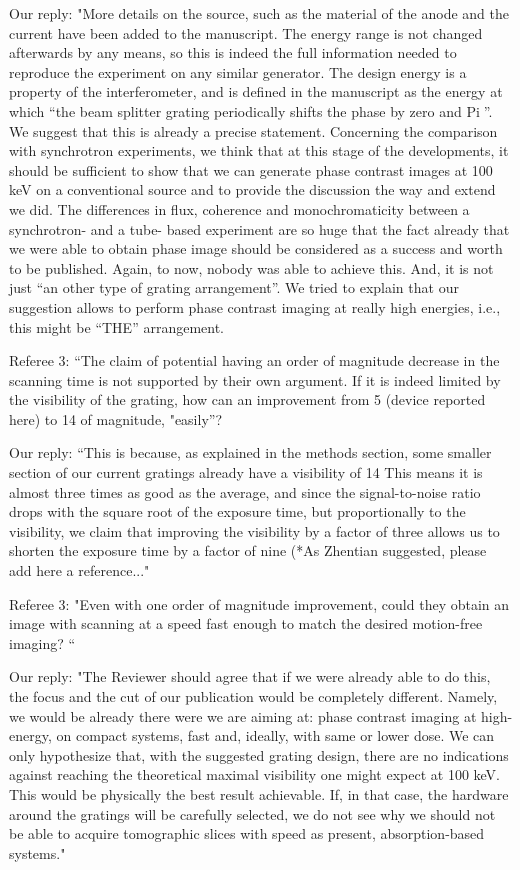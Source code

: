 \documentclass[a4paper,english]{scrartcl} \usepackage[detect-all]{siunitx}
\begin{document}
Our reply: "More details on the source, such as the material of the anode
and the current have been added to the manuscript. The energy range is not
changed afterwards by any means, so this is indeed the full information
needed to reproduce the experiment on any similar generator. The design
energy is a property of the interferometer, and is defined in the manuscript
as the energy at which “the beam splitter grating periodically shifts the
phase by zero and Pi”. We suggest that this is already a precise
statement. Concerning the comparison with synchrotron experiments, we think
that at this stage of the developments, it should be sufficient to show that
we can generate phase contrast images at 100 keV on a conventional source
and to provide the discussion the way and extend we did. The differences in
flux, coherence and monochromaticity between a synchrotron- and a tube-
based experiment are so huge that the fact already that we were able to
obtain phase image should be considered as a success and worth to be
published. Again, to now, nobody was able to achieve this. And, it is not
just “an other type of grating arrangement”. We tried to explain that our
suggestion  allows to perform phase contrast imaging at really high
energies, i.e., this might be “THE” arrangement.

Referee 3: “The claim of potential having an order of magnitude decrease in
the scanning time is not supported by their own argument. If it is indeed
limited by the visibility of the grating, how can an improvement from 5%
(device reported here) to 14%
of magnitude, "easily”? 

Our reply: “This is because, as explained in the methods section, some
smaller section of our current gratings already have a visibility of 14 %
This means it is almost three times as good as the average, and since the
signal-to-noise ratio drops with the square root of the exposure time, but
proportionally to the visibility, we claim that improving the visibility by
a factor of three allows us to shorten the exposure time by a factor of nine
(*As Zhentian suggested, please add here a reference..."

Referee 3: "Even with one order of magnitude improvement, could they obtain
an image with scanning at a speed fast enough to match the desired
motion-free imaging? “

Our reply: "The Reviewer should agree that if we were already able to do
this, the focus and the cut of our publication would be completely
different. Namely, we would be already there were we are aiming at: phase
contrast imaging at high-energy, on compact systems, fast and, ideally, with
same or lower dose. We can only hypothesize that, with the suggested grating
design, there are no indications against reaching the theoretical maximal
visibility one might expect at 100 keV. This would be physically the best
result achievable. If, in that case, the hardware around the gratings will
be carefully selected, we do not see why we should not be able to acquire
tomographic slices with speed as present, absorption-based systems." 
\end{document}
